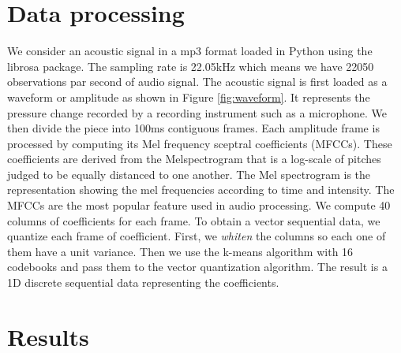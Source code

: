 \section{Data processing}
We consider an acoustic signal in a mp3 format loaded in Python using the librosa package. The sampling rate is 22.05kHz which means we have 22050 observations par second of audio signal. The acoustic signal is first loaded as a waveform or amplitude as shown in Figure \ref{fig:waveform}. It represents the pressure change recorded by a recording instrument such as a microphone. We then divide the piece into 100ms contiguous frames. Each amplitude frame is processed by computing its Mel frequency sceptral coefficients (MFCCs). These coefficients are derived from the Melspectrogram that is a log-scale of pitches judged to be equally distanced to one another. The Mel spectrogram is the representation showing the mel frequencies according to time and intensity. The MFCCs are the most popular feature used in audio processing. We compute 40 columns of coefficients for each frame. To obtain a vector sequential data, we quantize each frame of coefficient. First, we \textit{whiten} the columns so each one of them have a unit variance. Then we use the k-means algorithm with 16 codebooks and pass them to the vector quantization algorithm. The result is a 1D discrete sequential data representing the coefficients. 





\section{Results}

